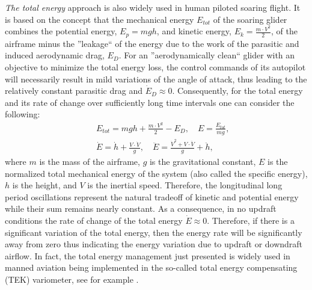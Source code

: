 \documentclass{ifacconf}
\begin{document}
\emph{The total energy} approach is also widely used in human piloted soaring flight. It
is based on the concept that the mechanical energy $E_{tot}$ of the soaring glider
combines the potential energy, $E_p=mgh$, and kinetic energy, $E_k=\frac{m\cdot V^2}{2}$,
of the airframe minus the ''leakage`` of the energy due to the work of the parasitic and
induced aerodynamic drag, $E_{D}$. For an ''aerodynamically clean`` glider with an
objective to minimize the total energy loss, the control commands of its autopilot will
necessarily result in mild variations of the angle of attack, thus leading to the
relatively constant parasitic drag and $\dot{E}_{D}\approx0$. Consequently, for the total
energy and its rate of change over sufficiently long time intervals one can consider the
following:
\begin{eqnarray}
    && E_{tot}=mgh+\frac{m\cdot V^2}{2}-E_{D}, \quad E=\frac{E_{tot}}{mg}, \nonumber \\
    && \dot{E}=\dot{h}+\frac{V \cdot \dot{V}}{g}, \quad \ddot{E}=\frac{\dot{V}^2 + V \cdot
    \ddot{V}}{g} + \ddot{h},
    \label{eq:totenergyrate}
\end{eqnarray}
where $m$ is the mass of the airframe, $g$ is the gravitational constant, $E$ is the
normalized total mechanical energy of the system (also called the specific energy), $h$
is the height, and $V$ is the inertial speed. Therefore, the longitudinal long period
oscillations represent the natural tradeoff of kinetic and potential energy while their
sum remains nearly constant. As a consequence, in no updraft conditions the rate of
change of the total energy $\dot{E}\approx 0$. Therefore, if there is a significant
variation of the total energy, then the energy rate will be significantly away from zero
thus indicating the energy variation due to updraft or downdraft airflow. In fact, the
total energy management just presented is widely used in manned aviation being
implemented in the so-called total energy compensating (TEK) variometer, see for example
\cite{PitLab:2013:Online}.
\end{document}
